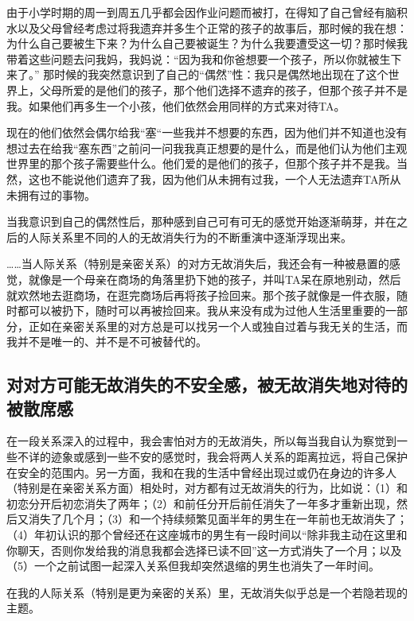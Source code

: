由于小学时期的周一到周五几乎都会因作业问题而被打，在得知了自己曾经有脑积水以及父母曾经考虑过将我遗弃并多生个正常的孩子的故事后，那时候的我在想：为什么自己要被生下来？为什么自己要被诞生？为什么我要遭受这一切？那时候我带着这些问题去问我妈，我妈说：“因为我和你爸想要一个孩子，所以你就被生下来了。”   那时候的我突然意识到了自己的“偶然”性：我只是偶然地出现在了这个世界上，父母所爱的是他们的孩子，那个他们选择不遗弃的孩子，但那个孩子并不是我。如果他们再多生一个小孩，他们依然会用同样的方式来对待TA。

现在的他们依然会偶尔给我“塞“一些我并不想要的东西，因为他们并不知道也没有想过去在给我“塞东西”之前问一问我我真正想要的是什么，而是他们认为他们主观世界里的那个孩子需要些什么。他们爱的是他们的孩子，但那个孩子并不是我。当然，这也不能说他们遗弃了我，因为他们从未拥有过我，一个人无法遗弃TA所从未拥有过的事物。

当我意识到自己的偶然性后，那种感到自己可有可无的感觉开始逐渐萌芽，并在之后的人际关系里不同的人的无故消失行为的不断重演中逐渐浮现出来。

……当人际关系（特别是亲密关系）的对方无故消失后，我还会有一种被悬置的感觉，就像是一个母亲在商场的角落里扔下她的孩子，并叫TA呆在原地别动，然后就欢然地去逛商场，在逛完商场后再将孩子捡回来。那个孩子就像是一件衣服，随时都可以被扔下，随时可以再被捡回来。我从来没有成为过他人生活里重要的一部分，正如在亲密关系里的对方总是可以找另一个人或独自过着与我无关的生活，而我并不是唯一的、并不是不可被替代的。




\subsection*{对对方可能无故消失的不安全感，被无故消失地对待的被散席感}

在一段关系深入的过程中，我会害怕对方的无故消失，所以每当我自认为察觉到一些不详的迹象或感到一些不安的感觉时，我会将两人关系的距离拉远，将自己保护在安全的范围内。另一方面，我和在我的生活中曾经出现过或仍在身边的许多人（特别是在亲密关系方面）相处时，对方都有过无故消失的行为，比如说：（1）和初恋分开后初恋消失了两年；（2）和前任分开后前任消失了一年多才重新出现，然后又消失了几个月；（3）和一个持续频繁见面半年的男生在一年前也无故消失了；（4）年初认识的那个曾经还在这座城市的男生有一段时间以“除非我主动在这里和你聊天，否则你发给我的消息我都会选择已读不回”这一方式消失了一个月；以及（5）一个之前试图一起深入关系但我却突然退缩的男生也消失了一年时间。

在我的人际关系（特别是更为亲密的关系）里，无故消失似乎总是一个若隐若现的主题。

